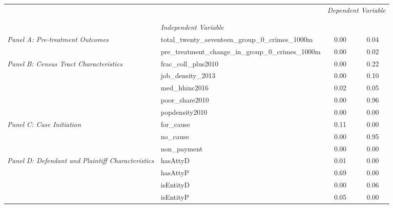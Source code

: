 \begin{tabular}{llcc}
\toprule
 &  & \multicolumn{2}{c}{\textit{Dependent Variable}} \\
\cline{3-4}
\\
 &  &  &  \\
 & \emph{Independent Variable} &  &  \\
\midrule
\multirow[c]{2}{3cm}{\textit{Panel A: Pre-treatment Outcomes}} & total_twenty_seventeen_group_0_crimes_1000m & 0.00 & 0.04 \\
 & pre_treatment_change_in_group_0_crimes_1000m & 0.00 & 0.02 \\
\cline{1-4}
\multirow[c]{5}{3cm}{\textit{Panel B: Census Tract Characteristics}} & frac_coll_plus2010 & 0.00 & 0.22 \\
 & job_density_2013 & 0.00 & 0.10 \\
 & med_hhinc2016 & 0.02 & 0.05 \\
 & poor_share2010 & 0.00 & 0.96 \\
 & popdensity2010 & 0.00 & 0.00 \\
\cline{1-4}
\multirow[c]{3}{3cm}{\textit{Panel C: Case Initiation}} & for_cause & 0.11 & 0.00 \\
 & no_cause & 0.00 & 0.95 \\
 & non_payment & 0.00 & 0.00 \\
\cline{1-4}
\multirow[c]{4}{3cm}{\textit{Panel D: Defendant and Plaintiff Characteristics}} & hasAttyD & 0.01 & 0.00 \\
 & hasAttyP & 0.69 & 0.00 \\
 & isEntityD & 0.00 & 0.06 \\
 & isEntityP & 0.05 & 0.00 \\
\cline{1-4}
\bottomrule
\end{tabular}
